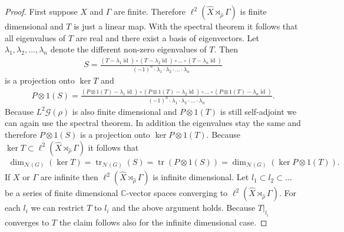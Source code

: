 \documentclass[12pt,a4paper]{scrartcl}
\theoremstyle{plain}
\theoremstyle{definition}
\numberwithin{equation}{section}
\newcommand{\C}{\mathbb{C}} %
\newcommand{\2}{\mathbb{Z} / 2 \mathbb{Z}}
\newcommand{\G}{\mathcal{G}}
\newcommand{\1}{\bar{1}}
\newcommand{\0}{\bar{0}}
\newcommand{\tr}{\operatorname{tr}}
\newcommand{\id}{\operatorname{id}}
\begin{document}
\begin{proof}
	First suppose $X$ and $\Gamma$ are finite. Therefore $\ell^2(\hat{X} \rtimes_{\hat{\rho}} \Gamma)$ is finite dimensional and $T$ is just a linear map. With the spectral theorem it follows that all eigenvalues of $T$ are real and there exist a basis of eigenvectors. Let $\lambda_1, \lambda_2, \ldots, \lambda_n$ denote the different non-zero eigenvalues of $T$. Then
	\begin{align*}
		S = \frac{(T - \lambda_1 \id) \circ (T - \lambda_2 \id) \circ \ldots \circ (T - \lambda_n \id)}{(-1)^n \cdot \lambda_1 \cdot \lambda_2 \cdot \ldots \cdot \lambda_n}
	\end{align*}
	is a projection onto $\ker T$ and 
	\begin{align*}
		P \otimes 1 (S) = \frac{(P \otimes 1(T) - \lambda_1 \id) \circ (P \otimes 1(T) - \lambda_2 \id) \circ \ldots \circ (P \otimes 1(T) - \lambda_n \id)}{(-1)^n \cdot \lambda_1 \cdot \lambda_2 \cdot \ldots \cdot \lambda_n}.
	\end{align*}
	Because $L^2 \G (\rho)$ is also finite dimensional and $P \otimes 1(T)$ is still self-adjoint we can again use the spectral theorem. In addition the eigenvalues stay the same and therefore $P \otimes 1 (S)$ is a projection onto $\ker P \otimes 1 (T)$. Because $\ker T \subset \ell^2(\hat{X} \rtimes_{\hat{\rho}} \Gamma) $ it follows that
	\begin{align*}
		\dim_{\mathcal{N}(G)}(\ker T) = \tr_{\mathcal{N}(G)}(S) = \tr(P \otimes 1 (S)) = \dim_{\mathcal{N}(G)}(\ker P \otimes 1 (T)).
	\end{align*}
	If $X$ or $\Gamma$ are infinite then $\ell^2(\hat{X} \rtimes_{\hat{\rho}} \Gamma)$ is infinite dimensional. Let $l_1 \subset l_2 \subset \ldots$ be a series of finite dimensional $\C$-vector spaces converging to $\ell^2(\hat{X} \rtimes_{\hat{\rho}} \Gamma)$. For each $l_i$ we can restrict $T$ to $l_i$ and the above argument holds. Because $T|_{l_i}$ converges to $T$ the claim follows also for the infinite dimensional case.
\end{proof}
\end{document}
